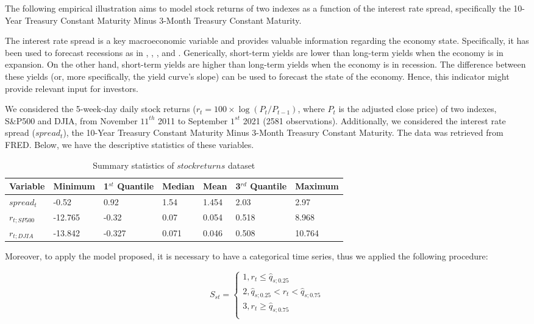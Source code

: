 The following empirical illustration aims to model stock returns of two indexes as a function of the interest rate spread, specifically the 10-Year Treasury Constant Maturity Minus 3-Month Treasury Constant Maturity.

The interest rate spread is a key macroeconomic variable and provides valuable information regarding the economy state. Specifically, it has been used to forecast recessions as in \citet{Estrella1996}, \citet{Dombrosky1996}, \citet{Chauvet2016}, \citet{Tian2019} and \citet{McMillan2021}. Generically, short-term yields are lower than long-term yields when the economy is in expansion. On the other hand, short-term yields are higher than long-term yields when the economy is in recession. The difference between these yields (or, more specifically, the yield curve's slope) can be used to forecast the state of the economy. Hence, this indicator might provide relevant input for investors.

We considered the 5-week-day daily stock returns (\(r_t=100 \times \log(P_t/P_{t-1})\), where \(P_t\) is the adjusted close price) of two indexes, S\&P500 and DJIA, from November \(11^{th}\) 2011 to September \(1^{st}\) 2021 (2581 observations). Additionally, we considered the interest rate spread (\(spread_{t}\)), the 10-Year Treasury Constant Maturity Minus 3-Month Treasury Constant Maturity. The data was retrieved from FRED. Below, we have the descriptive statistics of these variables.

\begin{table}

\caption{\label{tab:summary-stat-tex}Summary statistics of $stockreturns$ dataset}
\centering
\begin{tabular}[t]{l|l|l|l|l|l|l}
\hline
Variable & Minimum & 1$^{st}$ Quantile & Median & Mean & 3$^{rd}$ Quantile & Maximum\\
\hline
$spread_{t}$ & -0.52 & 0.92 & 1.54 & 1.454 & 2.03 & 2.97\\
\hline
$r_{t;SP500}$ & -12.765 & -0.32 & 0.07 & 0.054 & 0.518 & 8.968\\
\hline
$r_{t;DJIA}$ & -13.842 & -0.327 & 0.071 & 0.046 & 0.508 & 10.764\\
\hline
\end{tabular}
\end{table}

Moreover, to apply the model proposed, it is necessary to have a categorical time series, thus we applied the following procedure:

\[
S_{st}=
\begin{cases}
1, r_t \leq \widehat{q}_{s;0.25}\\
2, \widehat{q}_{s;0.25} < r_t < \widehat{q}_{s;0.75} \\
3, r_t \geq \widehat{q}_{s;0.75}\\
\end{cases}
\]

